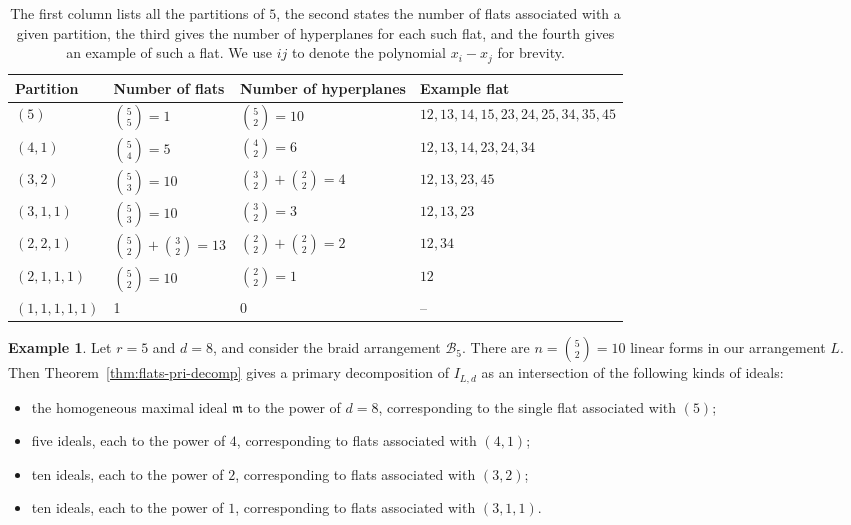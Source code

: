 \documentclass [a4paper,reqno, 11pt]{amsart}
\theoremstyle{plain}
\theoremstyle{plain}
\theoremstyle{plain}
\theoremstyle{plain}
\theoremstyle{definition}
\theoremstyle{definition}
\newtheorem{example}[theorem]{Example}
\theoremstyle{definition}
\theoremstyle{definition}
\theoremstyle{definition}
\theoremstyle{definition}
\newcommand{\frakm}{\mathfrak{m}}
\begin{document}
\renewcommand{\arraystretch}{1.4}

\begin{table}[h!]

\begin{center}
    \small\begin{tabular}{l|l|l|l}
        Partition & Number of flats & Number of hyperplanes & Example flat  \\
        \hline
  $(5)$ & $\binom{5}{5}=1$ & $\binom{5}{2}=10$ & $12,13,14,15,23,24,25,34,35,45$ \\[5pt]
  $(4,1)$ & $\binom{5}{4}=5$ & $\binom{4}{2}=6$ & $12,13,14,23,24,34$\\[5pt]
  $(3,2)$ & $\binom{5}{3}=10$ & $\binom{3}{2}+\binom{2}{2}=4$ & $12,13,23,45$\\[5pt]
  $(3,1,1)$ & $\binom{5}{3}=10$ & $\binom{3}{2}=3$ & $12,13,23$\\[5pt]
  $(2,2,1)$ & $\binom{5}{2}+\binom{3}{2}=13$ & $\binom{2}{2}+\binom{2}{2}=2$ & $12,34$\\[5pt]
  $(2,1,1,1)$ & $\binom{5}{2}=10$ & $\binom{2}{2}=1$ & $12$\\[4pt]
  $(1,1,1,1,1)$ & 1 & 0 & --
    \end{tabular}
\end{center}
\vspace{5mm}
\caption{The first column lists all the partitions of $5$, the second states the number of flats associated with a given partition, the third gives the number of hyperplanes for each such flat, and the fourth gives an example of such a flat. We use $ij$ to denote the polynomial $x_i-x_j$ for brevity.}
\label{table: partitions of braid arrangement}
\end{table}


\begin{example}\label{eg:braid5}
    Let $r=5$ and $d=8$, and consider the braid arrangement $\mathcal{B}_5$. There are $n=\binom{5}{2}=10$ linear forms in our arrangement $L$. Then Theorem~\ref{thm:flats-pri-decomp} gives a primary decomposition of $I_{L,d}$ as an intersection of the following kinds of ideals:
    \begin{itemize}
        \item the homogeneous maximal ideal $\frakm$ to the power of $d=8$, corresponding to the single flat associated with $(5)$;
        \item five ideals, each to the power of $4$, corresponding to flats associated with $(4,1)$;
        \item ten ideals, each to the power of $2$, corresponding to flats associated with $(3,2)$;
        \item ten ideals, each to the power of $1$, corresponding to flats associated with $(3,1,1)$.
    \end{itemize}
\end{example}
\end{document}
